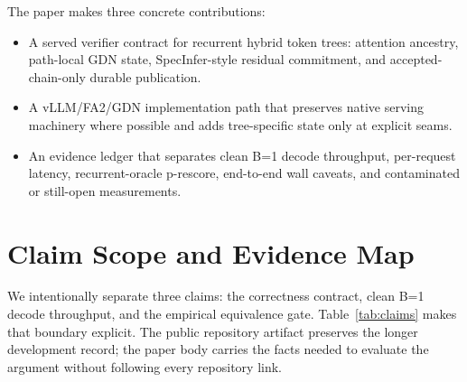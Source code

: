 \documentclass[conference]{IEEEtran}
\begin{document}
The paper makes three concrete contributions:
\begin{itemize}[leftmargin=*,noitemsep]
    \item A served verifier contract for recurrent hybrid token trees: attention ancestry, path-local GDN state, SpecInfer-style residual commitment, and accepted-chain-only durable publication.
    \item A vLLM/FA2/GDN implementation path that preserves native serving machinery where possible and adds tree-specific state only at explicit seams.
    \item An evidence ledger that separates clean B=1 decode throughput, per-request latency, recurrent-oracle p-rescore, end-to-end wall caveats, and contaminated or still-open measurements.
\end{itemize}

\section{Claim Scope and Evidence Map}

We intentionally separate three claims: the correctness contract, clean B=1 decode throughput, and the empirical equivalence gate. Table~\ref{tab:claims} makes that boundary explicit. The public repository artifact preserves the longer development record; the paper body carries the facts needed to evaluate the argument without following every repository link.
\end{document}
